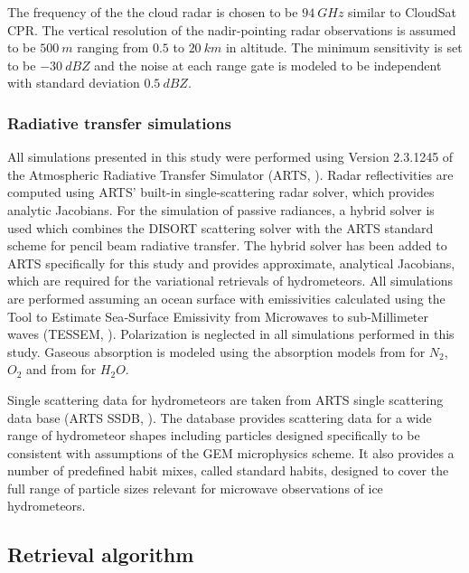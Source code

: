 \documentclass[journal abbreviation, manuscript]{copernicus}
\begin{document}
The frequency of the the cloud radar is chosen to be $94\ \unit{GHz}$ similar to
CloudSat CPR. The vertical resolution of the nadir-pointing radar observations
is assumed to be $500\ \unit{m}$ ranging from $0.5$ to $20\ \unit{km}$ in
altitude. The minimum sensitivity is set to be $-30\ \unit{dBZ}$ and the noise
at each range gate is modeled to be independent with standard deviation
$0.5\ \unit{dBZ}$.

\subsubsection{Radiative transfer simulations}
\label{sec:orge741b86}

All simulations presented in this study were performed using Version 2.3.1245 of
the Atmospheric Radiative Transfer Simulator (ARTS, \cite{arts18}). Radar
reflectivities are computed using ARTS' built-in single-scattering radar solver,
which provides analytic Jacobians. For the simulation of passive radiances, a
hybrid solver is used which combines the DISORT \citep{disort00} scattering
solver with the ARTS standard scheme for pencil beam radiative transfer. The
hybrid solver has been added to ARTS specifically for this study and provides
approximate, analytical Jacobians, which are required for the variational
retrievals of hydrometeors. All simulations are performed assuming an ocean
surface with emissivities calculated using the Tool to Estimate Sea‐Surface
Emissivity from Microwaves to sub‐Millimeter waves (TESSEM, \cite{prigent16}).
Polarization is neglected in all simulations performed in this study. Gaseous
absorption is modeled using the absorption models from \cite{rosenkranz93} for
$N_2$, $O_2$ and from \cite{rosenkranz98} for $H_2O$.

Single scattering data for hydrometeors are taken from ARTS single scattering
data base (ARTS SSDB, \citet{eriksson18}). The database provides scattering data
for a wide range of hydrometeor shapes including particles designed specifically
to be consistent with assumptions of the GEM microphysics scheme. It also
provides a number of predefined habit mixes, called standard habits, designed to
cover the full range of particle sizes relevant for microwave observations of
ice hydrometeors.

\subsection{Retrieval algorithm}
\label{sec:orgb528563}
\end{document}
